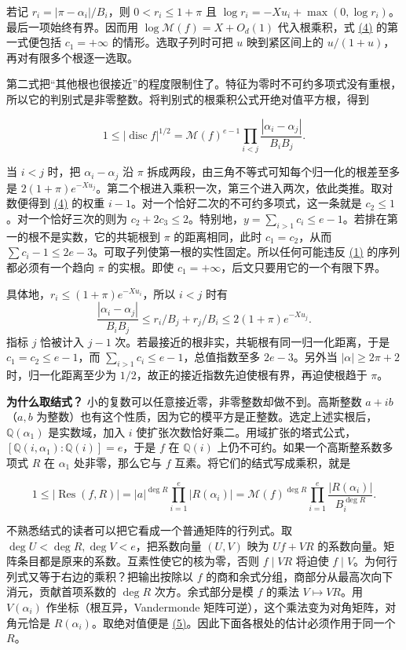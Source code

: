 \documentclass[11pt,a4paper]{article}
\begin{document}
若记 \(r_i=|\pi-\alpha_i|/B_i\)，则 \(0<r_i\le1+\pi\) 且 \(\log r_i=-Xu_i+\max(0,\log r_i)\)。最后一项始终有界。因而用 \(\log\mathcal M(f)=X+O_d(1)\) 代入根乘积，式 \hyperref[eq:4]{(4)} 的第一式便包括 \(c_1=+\infty\) 的情形。选取子列时可把 \(u\) 映到紧区间上的 \(u/(1+u)\)，再对有限多个根逐一选取。

第二式把``其他根也很接近''的程度限制住了。特征为零时不可约多项式没有重根，所以它的判别式是非零整数。将判别式的根乘积公式开绝对值平方根，得到

\[
 1\le |\operatorname{disc} f|^{1/2}
   =\mathcal M(f)^{e-1}\prod_{i<j}\frac{|\alpha_i-\alpha_j|}{B_iB_j}.
\]

当 \(i<j\) 时，把 \(\alpha_i-\alpha_j\) 沿 \(\pi\) 拆成两段，由三角不等式可知每个归一化的根差至多是 \(2(1+\pi)e^{-Xu_j}\)。第二个根进入乘积一次，第三个进入两次，依此类推。取对数便得到 \hyperref[eq:4]{(4)} 的权重 \(i-1\)。对一个恰好二次的不可约多项式，这一条就是 \(c_2\le1\)。对一个恰好三次的则为 \(c_2+2c_3\le2\)。特别地，\(y=\sum_{i>1}c_i\le e-1\)。若排在第一的根不是实数，它的共轭根到 \(\pi\) 的距离相同，此时 \(c_1=c_2\)，从而 \(\sum c_i-1\le 2e-3\)。可取子列使第一根的实性固定。所以任何可能违反 \hyperref[eq:1]{(1)} 的序列都必须有一个趋向 \(\pi\) 的实根。即使 \(c_1=+\infty\)，后文只要用它的一个有限下界。

具体地，\(r_i\le(1+\pi)e^{-Xu_i}\)，所以 \(i<j\) 时有 \[
 \frac{|\alpha_i-\alpha_j|}{B_iB_j}
 \le r_i/B_j+r_j/B_i\le 2(1+\pi)e^{-Xu_j}.
\] 指标 \(j\) 恰被计入 \(j-1\) 次。若最接近的根非实，共轭根有同一归一化距离，于是 \(c_1=c_2\le e-1\)，而 \(\sum_{i>1}c_i\le e-1\)，总值指数至多 \(2e-3\)。另外当 \(|\alpha|\ge 2\pi+2\) 时，归一化距离至少为 \(1/2\)，故正的接近指数先迫使根有界，再迫使根趋于 \(\pi\)。

\textbf{为什么取结式？} 小的复数可以任意接近零，非零整数却做不到。高斯整数 \(a+ib\)（\(a,b\) 为整数）也有这个性质，因为它的模平方是正整数。选定上述实根后，\(\mathbb Q(\alpha_1)\) 是实数域，加入 \(i\) 使扩张次数恰好乘二。用域扩张的塔式公式，\([\mathbb Q(i,\alpha_1):\mathbb Q(i)]=e\)，于是 \(f\) 在 \(\mathbb Q(i)\) 上仍不可约。如果一个高斯整系数多项式 \(R\) 在 \(\alpha_1\) 处非零，那么它与 \(f\) 互素。将它们的结式写成乘积，就是

\[
 1\le|\operatorname{Res}(f,R)|
 =|a|^{\deg R}\prod_{i=1}^e |R(\alpha_i)|
 =\mathcal M(f)^{\deg R}\prod_{i=1}^e
               \frac{|R(\alpha_i)|}{B_i^{\deg R}}.                         \tag{5}\label{eq:5}
\]

不熟悉结式的读者可以把它看成一个普通矩阵的行列式。取 \(\deg U<\deg R,\deg V<e\)，把系数向量 \((U,V)\) 映为 \(Uf+VR\) 的系数向量。矩阵条目都是原来的系数。互素性使它的核为零，否则 \(f\mid VR\) 将迫使 \(f\mid V\)。为何行列式又等于右边的乘积？把输出按除以 \(f\) 的商和余式分组，商部分从最高次向下消元，贡献首项系数的 \(\deg R\) 次方。余式部分是模 \(f\) 的乘法 \(V\mapsto VR\)。用 \(V(\alpha_i)\) 作坐标（根互异，Vandermonde 矩阵可逆），这个乘法变为对角矩阵，对角元恰是 \(R(\alpha_i)\)。取绝对值便是 \hyperref[eq:5]{(5)}。因此下面各根处的估计必须作用于同一个 \(R\)。
\end{document}
